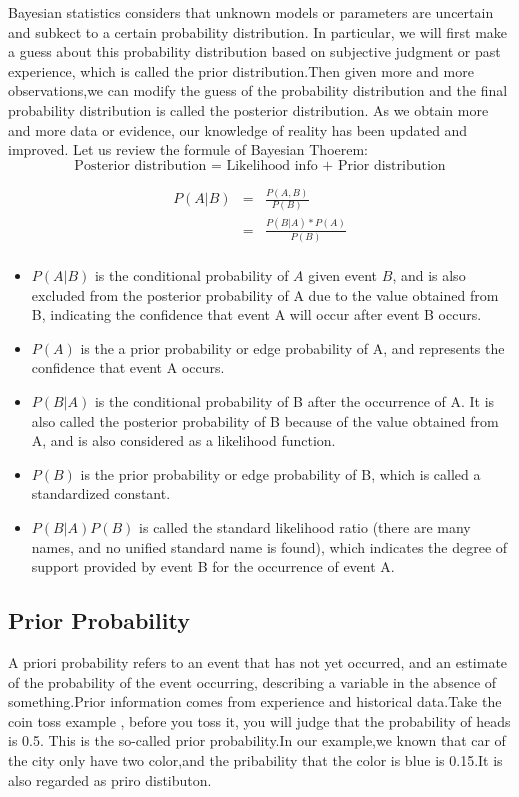 Bayesian statistics considers that unknown models or parameters are uncertain and subkect to a certain probability distribution.
In particular, we will first make a guess about this probability distribution based on subjective judgment or past experience, which is called the prior distribution.Then given more and more observations,we can modify the guess of the probability distribution and the final probability distribution is called the posterior distribution. As we obtain more and more data or evidence, our knowledge of reality has been updated and improved.
Let us review the formule of Bayesian Thoerem:
$$ \text{Posterior distribution = Likelihood info + Prior distribution}$$

\begin{eqnarray*}
P(A|B) &=& \frac{P(A,B)}{P(B)} \\
& = &\frac{P(B|A)*P(A)}{P(B)} \\
\end{eqnarray*}
\begin{itemize}
  \item $P(A | B)$ is the conditional probability of $A$ given event $B$, and is also excluded from the posterior probability of A due to the value obtained from B, indicating the confidence that event A will occur after event B occurs.

  \item $P(A)$ is the a prior probability or edge probability of A, and represents the confidence that event A occurs.

  \item $P(B|A)$ is the conditional probability of B after the occurrence of A. It is also called the posterior probability of B because of the value obtained from A, and is also considered as a likelihood function.

  \item $P(B)$ is the prior probability or edge probability of B, which is called a standardized constant.

  \item $P(B | A) P(B)$ is called the standard likelihood ratio (there are many names, and no unified standard name is found), which indicates the degree of support provided by event B for the occurrence of event A.
\end{itemize}
\subsection{Prior Probability}

A priori probability refers to an event that has not yet occurred, and an estimate of the probability of the event occurring, describing a variable in the absence of something.Prior information comes from experience and historical data.Take the coin toss example , before you toss it, you will judge that the probability of heads is 0.5. This is the so-called prior probability.In our example,we known that car of the city only have two color,and the pribability that the color is blue is 0.15.It is also regarded as priro distibuton.


